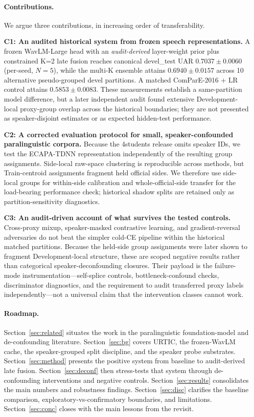 \paragraph{Contributions.} We argue three contributions, in increasing order of transferability.

\textbf{C1: An audited historical system from frozen speech representations.} A frozen WavLM-Large head with an \emph{audit-derived} layer-weight prior plus constrained K=2 late fusion reaches canonical devel\_test UAR $0.7037 \pm 0.0060$ (per-seed, $N{=}5$), while the multi-K ensemble attains $0.6940 \pm 0.0157$ across 10 alternative pseudo-grouped devel partitions. A matched ComParE-2016 $+$ LR control attains $0.5853 \pm 0.0083$. These measurements establish a same-partition model difference, but a later independent audit found extensive Development-local proxy-group overlap across the historical boundaries; they are not presented as speaker-disjoint estimates or as expected hidden-test performance.

\textbf{C2: A corrected evaluation protocol for small, speaker-confounded paralinguistic corpora.} Because the 4students release omits speaker IDs, we test the ECAPA-TDNN representation independently of the resulting group assignments. Side-local raw-space clustering is reproducible across methods, but Train-centroid assignments fragment held official sides. We therefore use side-local groups for within-side calibration and whole-official-side transfer for the load-bearing performance check; historical shadow splits are retained only as partition-sensitivity diagnostics.

\textbf{C3: An audit-driven account of what survives the tested controls.} Cross-proxy mixup, speaker-masked contrastive learning, and gradient-reversal adversaries do not beat the simpler cold-CE pipeline within the historical matched partitions. Because the held-side group assignments were later shown to fragment Development-local structure, these are scoped negative results rather than categorical speaker-deconfounding closures. Their payload is the failure-mode instrumentation---self-splice controls, bottleneck-confound checks, discriminator diagnostics, and the requirement to audit transferred proxy labels independently---not a universal claim that the intervention classes cannot work.

\paragraph{Roadmap.} Section~\ref{sec:related} situates the work in the paralinguistic foundation-model and de-confounding literature. Section~\ref{sec:bg} covers URTIC, the frozen-WavLM cache, the speaker-grouped split discipline, and the speaker probe substrates. Section~\ref{sec:method} presents the positive system from baseline to audit-derived late fusion. Section~\ref{sec:deconf} then stress-tests that system through de-confounding interventions and negative controls. Section~\ref{sec:results} consolidates the main numbers and robustness findings. Section~\ref{sec:disc} clarifies the baseline comparison, exploratory-vs-confirmatory boundaries, and limitations. Section~\ref{sec:conc} closes with the main lessons from the revisit.
